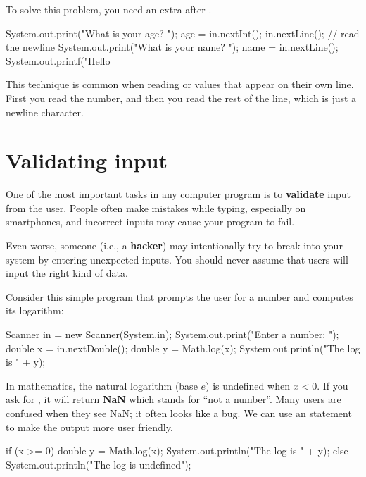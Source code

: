 To solve this problem, you need an extra  after .

\begin{code}
System.out.print("What is your age? ");
age = in.nextInt();
in.nextLine();  // read the newline
System.out.print("What is your name? ");
name = in.nextLine();
System.out.printf("Hello %
\end{code}

This technique is common when reading  or  values that appear on their own line.
First you read the number, and then you read the rest of the line, which is just a newline character.

\section{Validating input}
\label{validate}


One of the most important tasks in any computer program is to {\bf validate} input from the user.
People often make mistakes while typing, especially on smartphones, and incorrect inputs may cause your program to fail.

Even worse, someone (i.e., a {\bf hacker}) may intentionally try to break into your system by entering unexpected inputs.
You should never assume that users will input the right kind of data.

Consider this simple program that prompts the user for a number and computes its logarithm:

\begin{code}
	Scanner in = new Scanner(System.in);
	System.out.print("Enter a number: ");
	double x = in.nextDouble();
	double y = Math.log(x);
	System.out.println("The log is " + y);
\end{code}

In mathematics, the natural logarithm (base $e$) is undefined when $x < 0$.
If you ask for , it will return {\bf NaN} which stands for ``not a number''.
Many users are confused when they see NaN; it often looks like a bug.
We can use an  statement to make the output more user friendly.

\begin{code}
	if (x >= 0) {
		double y = Math.log(x);
		System.out.println("The log is " + y);
	} else {
		System.out.println("The log is undefined");
	}
\end{code}

